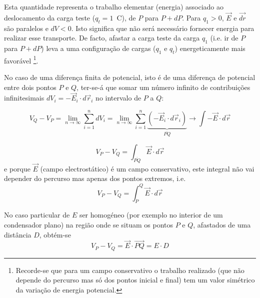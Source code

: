 \documentclass[a4paper,twoside,12pt]{article}      %
\begin{document}

 

Esta quantidade representa o trabalho elementar (energia) associado ao deslocamento da
carga teste ($q_t=1\,$ C), de $P$ para $P+dP$. Para $q_1 > 0$,	$\vec{E}$ e $\vec{dr}$ são paralelos e $dV < 0$. Isto significa que
não será necessário fornecer energia para realizar esse transporte. 
De facto, afastar a carga teste da carga $q_1$ (i.e. ir de $P$ para $P+dP$) leva a uma configuração de cargas ($q_1$ e $q_t$) energeticamente mais favorável \footnote{Recorde-se que para um campo conservativo o trabalho realizado (que não depende do percurso mas só dos pontos inicial e final) tem um valor simétrico da variação de energia potencial.}.

No caso de uma diferença finita de potencial, isto é de uma diferença de potencial entre dois pontos $P$ e $Q$, ter-se-á que somar um número infinito de contribuições infinitesimais $dV_i=- \vec{E}_i \cdot d\vec{r}_i$ no intervalo de $P$ a $Q$:

\begin{equation}
V_Q-V_P  = \lim_{n  \to \infty } \sum_{i=1}^n dV_i = \lim_{n \to \infty } \sum_{i=1}^n \underbrace{( - \vec{E}_i \cdot d\vec{r}_i )}_{\overline{PQ}} \rightarrow \int - \vec{E} \cdot d\vec{r}
\end{equation}

\begin{equation*} 
V_P - V_Q  = \int_{\overline{PQ}}  \vec{E} \cdot d \vec{r}
\end{equation*}
e porque $\vec{E}$ (campo electrostático) é um campo conservativo, este integral não vai depender do percurso mas apenas dos pontos extremos, i.e.
\begin{equation*} 
V_P - V_Q  = \int_P^Q  \vec{E} \cdot d\vec{r}
\end{equation*}


No caso particular de $E$ ser homogéneo (por exemplo no interior de um condensador plano)  na região onde se situam os pontos $P$ e $Q$, afastados de uma distância $D$, obtém-se 
\begin{equation}\label{eq:difPot}
V_P - V_Q  =  \vec{E}\cdot\vec{PQ}=E\cdot D
\end{equation}
\end{document}

